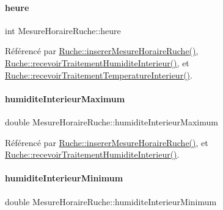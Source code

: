 \paragraph{\texorpdfstring{heure}{heure}}
{\footnotesize\ttfamily int Mesure\+Horaire\+Ruche\+::heure}



Référencé par \hyperlink{class_ruche_a3a093c088d9c97f347394c8a681f7302}{Ruche\+::inserer\+Mesure\+Horaire\+Ruche()}, \hyperlink{class_ruche_a6d4c59f2850f803a0ed1946e737b4262}{Ruche\+::recevoir\+Traitement\+Humidite\+Interieur()}, et \hyperlink{class_ruche_a2d2a681916140b977d45423d0d5d7b34}{Ruche\+::recevoir\+Traitement\+Temperature\+Interieur()}.

\mbox{\label{struct_mesure_horaire_ruche_ac8733bd08c235de27dd3eea85749c3f6}} 
\paragraph{\texorpdfstring{humidite\+Interieur\+Maximum}{humiditeInterieurMaximum}}
{\footnotesize\ttfamily double Mesure\+Horaire\+Ruche\+::humidite\+Interieur\+Maximum}



Référencé par \hyperlink{class_ruche_a3a093c088d9c97f347394c8a681f7302}{Ruche\+::inserer\+Mesure\+Horaire\+Ruche()}, et \hyperlink{class_ruche_a6d4c59f2850f803a0ed1946e737b4262}{Ruche\+::recevoir\+Traitement\+Humidite\+Interieur()}.

\mbox{\label{struct_mesure_horaire_ruche_adf0cbf1a3451cced1ba6fb9573654236}} 
\paragraph{\texorpdfstring{humidite\+Interieur\+Minimum}{humiditeInterieurMinimum}}
{\footnotesize\ttfamily double Mesure\+Horaire\+Ruche\+::humidite\+Interieur\+Minimum}



